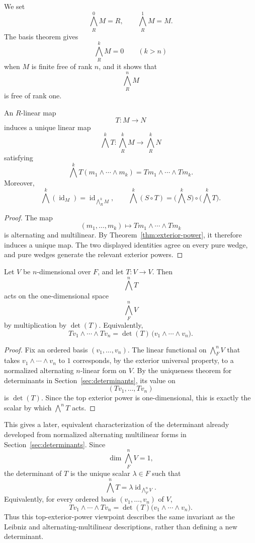 We set
\[
\bigwedge_R^0M=R,
\qquad
\bigwedge_R^1M=M.
\]
The basis theorem gives
\[
\bigwedge_R^kM=0
\qquad(k>n)
\]
when \(M\) is finite free of rank \(n\), and it shows that
\[
\bigwedge_R^nM
\]
is free of rank one.

\begin{proposition}\label{prop:exterior-maps}
An \(R\)-linear map
\[
T:M\longrightarrow N
\]
induces a unique linear map
\[
\bigwedge^kT:\bigwedge_R^kM\longrightarrow\bigwedge_R^kN
\]
satisfying
\[
\bigwedge^kT(m_1\wedge\cdots\wedge m_k)
=Tm_1\wedge\cdots\wedge Tm_k.
\]
Moreover,
\[
\bigwedge^k(\operatorname{id}_M)
=\operatorname{id}_{\bigwedge_R^kM},
\qquad
\bigwedge^k(S\circ T)
=\bigl(\bigwedge^kS\bigr)\circ\bigl(\bigwedge^kT\bigr).
\]
\end{proposition}
\begin{proof}
The map
\[
(m_1,\ldots,m_k)\longmapsto Tm_1\wedge\cdots\wedge Tm_k
\]
is alternating and multilinear.  By Theorem~\ref{thm:exterior-power}, it
therefore induces a unique map.  The two displayed identities agree
on every pure wedge, and pure wedges generate the relevant exterior powers.
\end{proof}

\begin{theorem}
Let \(V\) be \(n\)-dimensional over \(F\), and let \(T:V\to V\).  Then
\[
\bigwedge^nT
\]
acts on the one-dimensional space
\[
\bigwedge_F^nV
\]
by multiplication by \(\det(T)\).  Equivalently,
\[
Tv_1\wedge\cdots\wedge Tv_n
=\det(T)\,
\bigl(v_1\wedge\cdots\wedge v_n\bigr).
\]
\end{theorem}
\begin{proof}
Fix an ordered basis \((v_1,\ldots,v_n)\).  The linear functional on
\(\bigwedge_F^nV\) that takes \(v_1\wedge\cdots\wedge v_n\) to \(1\)
corresponds, by the exterior universal property, to a normalized alternating
\(n\)-linear form on \(V\).  By the uniqueness theorem for determinants in
Section~\ref{sec:determinants}, its value on
\[
(Tv_1,\ldots,Tv_n)
\]
is \(\det(T)\).  Since the top exterior power is one-dimensional, this is
exactly the scalar by which \(\bigwedge^nT\) acts.
\end{proof}

This gives a later, equivalent characterization of the determinant already
developed from normalized alternating multilinear forms in
Section~\ref{sec:determinants}.  Since
\[
\dim\bigwedge_F^nV=1,
\]
the determinant of \(T\) is the unique scalar \(\lambda\in F\) such that
\[
\bigwedge^nT
=\lambda\operatorname{id}_{\bigwedge_F^nV}.
\]
Equivalently, for every ordered basis \((v_1,\ldots,v_n)\) of \(V\),
\[
Tv_1\wedge\cdots\wedge Tv_n
=\det(T)\bigl(v_1\wedge\cdots\wedge v_n\bigr).
\]
Thus this top-exterior-power viewpoint describes the same invariant as the
Leibniz and alternating-multilinear descriptions, rather than defining a
new determinant.

